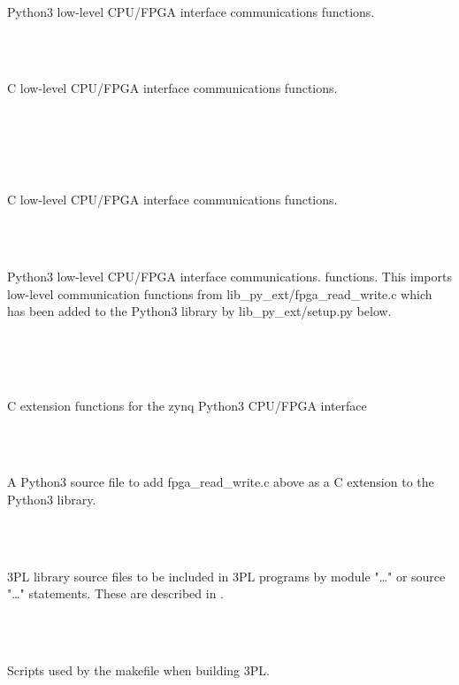 \begin{tabbing}
            \>\>\>\\
                    \>\>\>\>\>\parbox[t]{11cm}{Python3 low-level CPU/FPGA
                    interface communications functions.}\\
            \>\>\>\\
                    \>\>\>\>\>\parbox[t]{11cm}{C low-level CPU/FPGA interface
                    communications functions.}\\
        \>\>\\
            \>\>\>\\
                    \>\>\>\>\\
                    \>\>\>\>\>\>\parbox[t]{10cm}{C low-level CPU/FPGA
                    interface communications functions.}\\                
                    \>\>\>\>\\
                    \>\>\>\>\>\>\parbox[t]{10cm}{Python3 low-level CPU/FPGA
                        interface communications. functions. This imports
                        low-level communication functions from
                        lib\_py\_ext/fpga\_read\_write.c which has been
                        added to the Python3 library by
                        lib\_py\_ext/setup.py below.}\\
            \>\>\>\\
            \>\>\>\>\\
                \>\>\>\>\>\>\parbox[t]{10cm}{C extension functions for the zynq
                        Python3 CPU/FPGA interface}\\
            \>\>\>\>\\
                \>\>\>\>\>\>\parbox[t]{10cm}{A Python3 source file to add
                        fpga\_read\_write.c above as a C extension to the
                        Python3 library.}\\
        \>\\
            \>\>\>\parbox[t]{12cm}{3PL library source files to be included in 3PL programs by
            module "\ldots" or source "\ldots" statements. These are described in
            .}\\
            
        \>\\
            \>\>\>\parbox[t]{12cm}{Scripts used by the makefile when building
            3PL.}\\
            

\end{tabbing}
